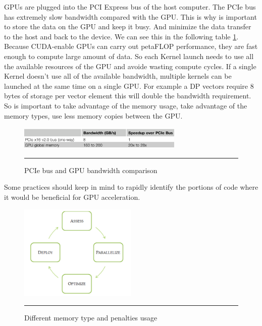 GPUs are plugged into the PCI Express bus of the host computer. The PCIe bus has extremely slow bandwidth compared with the GPU. This is why is important to store the data on the GPU and keep it busy. And minimize the data transfer to the host and back to the device. We can see this in the following table \ref{fig:PCI}.  Because CUDA-enable GPUs can carry out petaFLOP performance, they are fast enough to compute large amount of data. So each Kernel launch needs to use all the available resources of the GPU and avoide wasting compute cycles. If a single Kernel doesn't use all of the available bandwidth, multiple kernels can be launched at the same time on a single GPU.
For example a DP vectors require 8 bytes of storage per vector element this will double the bandwidth requirement. So is important to take advantage of the memory usage, take advantage of the memory types, use less memory copies between the GPU. \cite{design}

\begin{figure}[htbp]
	\centering
		\includegraphics[width=0.7\textwidth]{Figures/PCI.png}
		\rule{35em}{0.5pt}
	\caption[PCIe Bandwidth]{PCIe bus and GPU bandwidth comparison }
	\label{fig:PCI}
\end{figure}


Some practices should keep in mind to rapidly identify the portions of code where it would be beneficial for GPU acceleration.  \cite{practices}

\begin{figure}[htbp]
	\centering
		\includegraphics[width=0.5\textwidth]{Figures/apod.png}
		\rule{35em}{0.5pt}
	\caption[Different memory types]{Different memory type and penalties usage}
	\label{fig:apod}
\end{figure}

